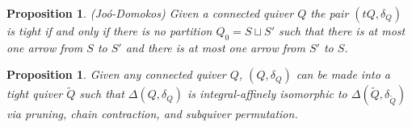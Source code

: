 \documentclass[11pt]{amsart}
\theoremstyle{plain}
\newtheorem{proposition}[theorem]{Proposition}
\theoremstyle{definition}
\begin{document}

\begin{proposition}\label{canonical-contraction-condition}
    (Joó-Domokos) Given a connected quiver $Q$ the pair $(tQ, \delta_Q)$ is tight if and only if there is no partition $Q_0 = S \sqcup S'$ such that there is at most one arrow from $S$ to $S'$ and there is at most one arrow from $S'$ to $S$.
\end{proposition}

\begin{proposition}
    Given any connected quiver $Q$, $(Q, \delta_Q)$ can be made into a tight quiver $\widetilde{Q}$ such that $\Delta(Q, \delta_Q)$ is integral-affinely isomorphic to $\Delta(\widetilde{Q}, \delta_{\widetilde{Q}})$ via pruning, chain contraction, and subquiver permutation.
\end{proposition}
\end{document}
